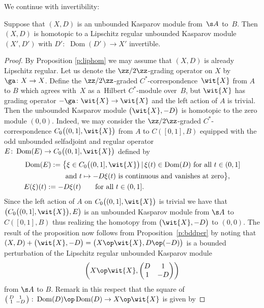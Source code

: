 We continue with invertibility:

\begin{prop}\label{p:lipinv}
Suppose that $(X,D)$ is an unbounded Kasparov module from~$\s A$ to~$B$. Then $(X,D)$ is homotopic to a Lipschitz regular unbounded Kasparov module $(X', D')$ with $D'\colon$ $\operatorname{Dom}(D') \to X'$ invertible.
\end{prop}
\begin{proof}By Proposition \ref{p:liphom} we may assume that $(X,D)$ is already Lipschitz regular. Let us denote the $\zz/2\zz$-grading operator on $X$ by $\ga\colon X \to X$. Define the $\zz/2\zz$-graded $C^*$-corresponden\-ce~$\wit{X}$ from $A$ to $B$ which agrees with~$X$ as a~Hilbert $C^*$-module over~$B$, but $\wit{X}$ has grading operator $-\ga\colon \wit{X} \to \wit{X}$ and the left action of $A$ is trivial. Then the unbounded Kasparov module $\big(\wit{X},-D\big)$ is homotopic to the zero module $(0,0)$. Indeed, we may consider the $\zz/2\zz$-graded $C^*$-correspondence $C_0\big( (0,1],\wit{X}\big)$ from $A$ to $C( [0,1],B)$ equipped with the odd unbounded selfadjoint and regular operator $E\colon \operatorname{Dom}(E) \to C_0\big( (0,1],\wit{X}\big)$ defined by
\begin{gather*}
\begin{split}
& \operatorname{Dom}(E) := \big\{ \xi \in C_0\big( (0,1],\wit{X}\big) \,|\, \xi(t) \in \operatorname{Dom}(D) \ \text{for all} \ t \in (0,1] \\
& \hphantom{\operatorname{Dom}(E) := \big\{}{} \text{and} \ t \mapsto - D \xi(t) \ \text{is continuous and vanishes at zero} \big\},\\
& E(\xi)(t) := - D \xi(t) \qquad \text{for all } t \in (0,1] .
\end{split}
\end{gather*}
Since the left action of $A$ on $C_0\big( (0,1],\wit{X}\big)$ is trivial we have that $\big( C_0\big( (0,1],\wit{X}\big), E\big)$ is an unbounded Kasparov module from $\s A$ to $C([0,1],B)$ thus realizing the homotopy from $\big(\wit{X},-D\big)$ to $(0,0)$. The result of the proposition now follows from Proposition~\ref{p:bddper} by noting that $(X,D) + \big(\wit{X}, -D\big) = \big(X \op \wit{X}, D \op (-D)\big)$ is a bounded perturbation of the Lipschitz regular unbounded Kasparov module
\[
\left(X \op \wit{X}, \left(\begin{matrix} D & 1 \\ 1 & - D\end{matrix}\right)\right)
\]
from $\s A$ to $B$. Remark in this respect that the square of $\left(\begin{smallmatrix}D & 1 \\ 1 & - D\end{smallmatrix}\right)\colon \operatorname{Dom}(D) \op \operatorname{Dom}(D) \to X \op \wit{X}$ is given by

\end{proof}
